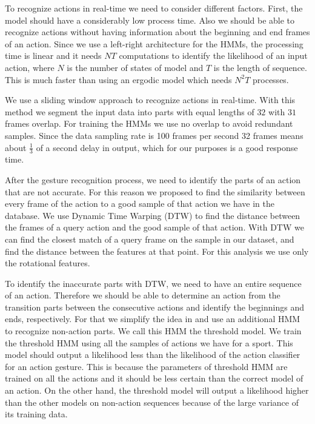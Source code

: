 To recognize actions in real-time we need to consider different factors. First, the model should have a considerably low process time. Also we should be able to recognize actions without having information about the beginning and end frames of an action. Since we use a left-right architecture for the HMMs, the processing time is linear and it needs $NT$ computations to identify the likelihood of an input action, where $N$ is the number of states of model and $T$ is the length of sequence. This is much faster than using an ergodic model which needs $N^2T$ processes.

We use a sliding window approach to recognize actions in real-time. With this method we segment the input data into parts with equal lengths of $32$ with $31$ frames overlap. For training the HMMs we use no overlap to avoid redundant samples. Since the data sampling rate is 100 frames per second 32 frames means about $\frac{1}{3}$ of a second delay in output, which for our purposes is a good response time.

After the gesture recognition process, we need to identify the parts of an action that are not accurate. For this reason we proposed to find the similarity between every frame of the action to a good sample of that action we have in the database. We use Dynamic Time Warping (DTW) to find the distance between the frames of a query action and the good sample of that action. With DTW we can find the closest match of a query frame on the sample in our dataset, and find the distance between the features at that point. For this analysis we use only the rotational features.

To identify the inaccurate parts with DTW, we need to have an entire sequence of an action. Therefore we should be able to determine an action from the transition parts between the consecutive actions and identify the beginnings and ends, respectively. For that we simplify the idea in \cite{lee1999hmm} and use an additional HMM to recognize non-action parts. We call this HMM the threshold model. We train the threshold HMM using all the samples of actions we have for a sport. This model should output a likelihood less than the likelihood of the action classifier for an action gesture. This is because the parameters of threshold HMM are trained on all the actions and it should be less certain than the correct model of an action. On the other hand, the threshold model will output a likelihood higher than the other models on non-action sequences because of the large variance of its training data.
